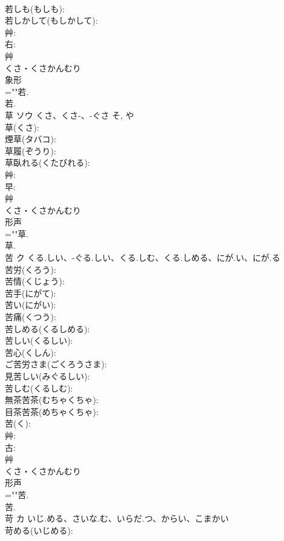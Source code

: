 \documentclass[8pt]{extreport}
\begin{document}
\begin{CJK}{UTF8}{min}
\\	若しも(もしも): 
\\	若しかして(もしかして): 
\\	艸: 
\\	右: 
\\	艸	
\\	くさ・くさかんむり	
\\	象形 
\\	=""若.
\\	若.
\\	草	ソウ	くさ、くさ-、-ぐさ	そ, や	
\\	草(くさ): 
\\	煙草(タバコ): 
\\	草履(ぞうり): 
\\	草臥れる(くたびれる): 
\\	艸: 
\\	早: 
\\	艸	
\\	くさ・くさかんむり	
\\	形声 
\\	=""草.
\\	草.
\\	苦	ク	くる.しい、-ぐる.しい、くる.しむ、くる.しめる、にが.い、にが.る		
\\	苦労(くろう): 
\\	苦情(くじょう): 
\\	苦手(にがて): 
\\	苦い(にがい): 
\\	苦痛(くつう): 
\\	苦しめる(くるしめる): 
\\	苦しい(くるしい): 
\\	苦心(くしん): 
\\	ご苦労さま(ごくろうさま): 
\\	見苦しい(みぐるしい): 
\\	苦しむ(くるしむ): 
\\	無茶苦茶(むちゃくちゃ): 
\\	目茶苦茶(めちゃくちゃ): 
\\	苦(く): 
\\	艸: 
\\	古: 
\\	艸	
\\	くさ・くさかんむり	
\\	形声 
\\	=""苦.
\\	苦.
\\	苛	カ	いじ.める、さいな.む、いらだ.つ、からい、こまかい		
\\	苛める(いじめる): 

\end{CJK}
\end{document}

